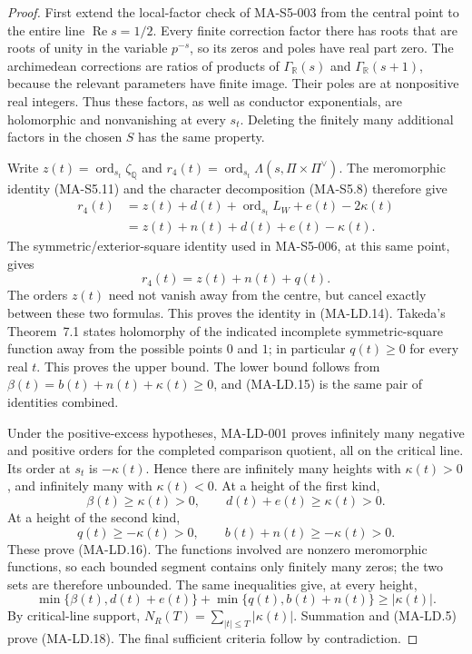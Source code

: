 \begin{proof}
First extend the local-factor check of MA-S5-003 from the
central point to the entire line $\operatorname{Re}s=1/2$.
Every finite correction factor there has roots that are
roots of unity in the variable $p^{-s}$, so its zeros and
poles have real part zero. The archimedean corrections are
ratios of products of $\Gamma_{\mathbb R}(s)$ and
$\Gamma_{\mathbb R}(s+1)$, because the relevant parameters
have finite image. Their poles are at nonpositive real
integers. Thus these factors, as well as conductor
exponentials, are holomorphic and nonvanishing at every
$s_t$. Deleting the finitely many additional factors in
the chosen $S$ has the same property.

Write $z(t)=\operatorname{ord}_{s_t}\zeta_{\mathbb Q}$ and
$r_4(t)=\operatorname{ord}_{s_t}
\Lambda(s,\Pi\times\Pi^\vee)$.
The meromorphic identity (MA-S5.11) and the character
decomposition (MA-S5.8) therefore give
\[
 \begin{split}
 r_4(t)
 &=z(t)+d(t)+\operatorname{ord}_{s_t}L_W+e(t)
                                       -2\kappa(t)\\
 &=z(t)+n(t)+d(t)+e(t)-\kappa(t).
 \end{split}
\]
The symmetric/exterior-square identity used in MA-S5-006,
at this same point, gives
\[
                         r_4(t)=z(t)+n(t)+q(t).
\]
The orders $z(t)$ need not vanish away from the centre,
but cancel exactly between these two formulas. This proves
the identity in (MA-LD.14). Takeda's Theorem~7.1 states
holomorphy of the indicated incomplete symmetric-square
function away from the possible points $0$ and $1$;
in particular $q(t)\ge0$ for every real $t$. This proves
the upper bound. The lower bound follows from
$\beta(t)=b(t)+n(t)+\kappa(t)\ge0$, and (MA-LD.15) is
the same pair of identities combined.

Under the positive-excess hypotheses, MA-LD-001 proves
infinitely many negative and positive orders for the
completed comparison quotient, all on the critical line.
Its order at $s_t$ is $-\kappa(t)$. Hence there are
infinitely many heights with $\kappa(t)>0$, and infinitely
many with $\kappa(t)<0$. At a height of the first kind,
\[
              \beta(t)\ge\kappa(t)>0,
              \qquad d(t)+e(t)\ge\kappa(t)>0.
\]
At a height of the second kind,
\[
              q(t)\ge-\kappa(t)>0,
              \qquad b(t)+n(t)\ge-\kappa(t)>0.
\]
These prove (MA-LD.16). The functions involved are nonzero
meromorphic functions, so each bounded segment contains
only finitely many zeros; the two sets are therefore
unbounded. The same inequalities give, at every height,
\[
 \min\{\beta(t),d(t)+e(t)\}
     +\min\{q(t),b(t)+n(t)\}\ge|\kappa(t)|.
\]
By critical-line support, $N_R(T)=\sum_{|t|\le T}|\kappa(t)|$.
Summation and (MA-LD.5) prove (MA-LD.18). The final sufficient
criteria follow by contradiction.
\end{proof}

